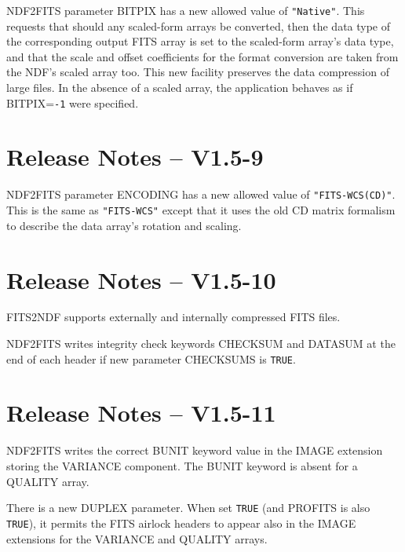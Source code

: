 \documentclass[twoside,11pt]{article}
\newcommand{\htmlref}[2]{#1}
\begin{document}
\htmlref{NDF2FITS}{NDF2FITS} parameter BITPIX has a new allowed value
of \texttt{"Native"}.  This requests that should any scaled-form arrays be 
converted, then the data type of the corresponding output FITS array 
is set to the scaled-form array's data type, and that the scale and
offset coefficients for the format conversion are taken from the NDF's
scaled array too.  This new facility preserves the data compression
of large files.  In the absence of a scaled array, the application
behaves as if BITPIX=\texttt{-1} were specified.

\section{Release Notes -- V1.5-9}

\htmlref{NDF2FITS}{NDF2FITS} parameter ENCODING has a new allowed
value of \texttt{"FITS-WCS(CD)"}.  This is the same as
\texttt{"FITS-WCS"} except that it uses the old CD matrix formalism 
to describe the data array's rotation and scaling.

\section{Release Notes -- V1.5-10}

\htmlref{FITS2NDF}{FITS2NDF} supports externally and internally compressed
FITS files.

\htmlref{NDF2FITS}{NDF2FITS} writes integrity check keywords CHECKSUM
and DATASUM at the end of each header if new parameter CHECKSUMS is 
\texttt{TRUE}.

\section{Release Notes -- V1.5-11}

\htmlref{NDF2FITS}{NDF2FITS} writes the correct BUNIT keyword value in 
the IMAGE extension storing the VARIANCE component.  The BUNIT
keyword is absent for a QUALITY array.

There is a new DUPLEX parameter.  When set \texttt{TRUE} (and PROFITS
is also \texttt{TRUE}), it permits the FITS airlock headers to appear
also in the IMAGE extensions for the VARIANCE and QUALITY arrays.
\end{document}
